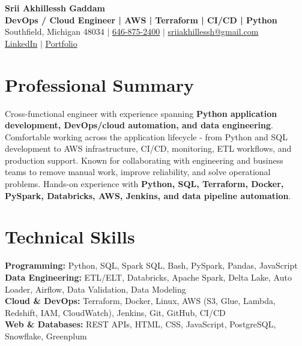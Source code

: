 \documentclass[letterpaper,10pt]{article}
\begin{document}
\fontsize{9.35pt}{10.45pt}\selectfont

\begin{center}
    {\LARGE \textbf{Srii Akhillessh Gaddam}} \\[-1pt]
    \textbf{DevOps / Cloud Engineer | AWS | Terraform | CI/CD | Python} \\[2pt]
    Southfield, Michigan 48034 $|$
    \href{tel:6468752400}{646-875-2400} $|$
    \href{mailto:sriiakhillessh@gmail.com}{sriiakhillessh@gmail.com} \\[1pt]
    \href{https://www.linkedin.com/in/srii-akhiilessh-gaddam-b48668191/}{LinkedIn} $|$
    \href{https://sriiakhillesshg.github.io/portfolio/}{Portfolio}
\end{center}
\vspace{-8pt}

\section{Professional Summary}
\small{Cross-functional engineer with experience spanning \textbf{Python application development, DevOps/cloud automation, and data engineering}. Comfortable working across the application lifecycle - from Python and SQL development to AWS infrastructure, CI/CD, monitoring, ETL workflows, and production support. Known for collaborating with engineering and business teams to remove manual work, improve reliability, and solve operational problems. Hands-on experience with \textbf{Python, SQL, Terraform, Docker, PySpark, Databricks, AWS, Jenkins, and data pipeline automation}.}

\section{Technical Skills}
\small{
\textbf{Programming:} Python, SQL, Spark SQL, Bash, PySpark, Pandas, JavaScript \\
\textbf{Data Engineering:} ETL/ELT, Databricks, Apache Spark, Delta Lake, Auto Loader, Airflow, Data Validation, Data Modeling \\
\textbf{Cloud \& DevOps:} Terraform, Docker, Linux, AWS (S3, Glue, Lambda, Redshift, IAM, CloudWatch), Jenkins, Git, GitHub, CI/CD \\
\textbf{Web \& Databases:} REST APIs, HTML, CSS, JavaScript, PostgreSQL, Snowflake, Greenplum
}
\end{document}
